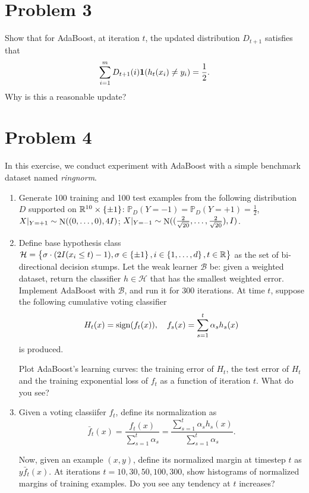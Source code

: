 \documentclass{article}
\DeclareMathOperator*{\sign}{{\rm sign}}
\DeclareMathOperator*{\N}{{\rm N}}
\newcommand{\RR}{\mathbb{R}} %
\newcommand{\PP}{\mathbb{P}} %
\newcommand{\Hcal}{\mathcal{H}} %
\newcommand{\Bcal}{\mathcal{B}} %
\newcommand*{\one}{{\bf 1}}
\begin{document}
\section*{Problem 3}
Show that for AdaBoost, at iteration $t$, the updated distribution $D_{t+1}$
satisfies that
\[
 \sum_{i=1}^m D_{t+1}(i) \one(h_t(x_i) \neq y_i) = \frac12.
\]
Why is this a reasonable update?

\section*{Problem 4}
In this exercise, we conduct experiment with AdaBoost with a simple benchmark dataset named {\em ringnorm}.
\begin{enumerate}
  \item Generate 100 training and 100 test examples from the following distribution $D$ supported on $\RR^{10} \times \cbr{\pm 1}$: $\PP_D(Y = -1) = \PP_D(Y = +1) = \frac12$, $X |_{Y = +1} \sim \N((0,\ldots,0), 4I)$; $X |_{Y = -1} \sim \N((\frac{2}{\sqrt{20}}, \ldots, \frac{2}{\sqrt{20}}), I)$.
  \item Define base hypothesis class $\Hcal = \cbr{\sigma \cdot (2I(x_i \leq t) - 1), \sigma \in \cbr{\pm 1}, i \in \cbr{1,\ldots,d}, t \in \RR}$ as the set of bi-directional decision stumps. Let the weak learner $\Bcal$ be: given a weighted dataset, return the classifier $h \in \Hcal$ that has the smallest weighted error. Implement AdaBoost with $\Bcal$, and run it for $300$ iterations. At time $t$, suppose the following cumulative voting classifier
  \[ H_t(x) = \sign(f_t(x)), \quad f_s(x) = \sum_{s=1}^t \alpha_s h_s(x) \]
  is produced.

  Plot AdaBoost's learning curves: the training error of $H_t$, the test error of $H_t$ and the training exponential loss of $f_t$ as a function of iteration $t$. What do you see?

  \item Given a voting classiifer $f_t$, define its normalization as
  \begin{equation}
    \bar{f}_t(x) = \frac{f_t(x)}{\sum_{s=1}^t \alpha_s} = \frac{\sum_{s=1}^t \alpha_s h_s(x)}{\sum_{s=1}^t \alpha_s}.
    \label{eqn:normalize}
  \end{equation}

  Now, given an example $(x,y)$, define its normalized margin at timestep $t$ as $y\bar{f}_t(x)$. At iterations $t = 10, 30, 50, 100, 300$, show histograms of normalized margins of training examples. Do you see any tendency at $t$ increases?
\end{enumerate}
\end{document}
